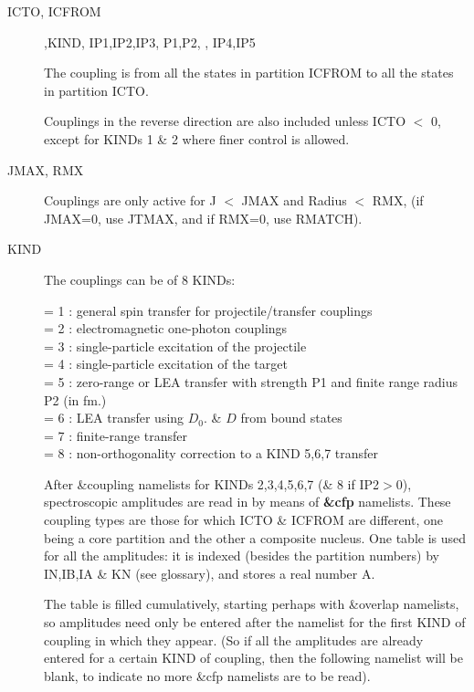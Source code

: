 \documentclass[11pt]{article}
\begin{document}
\begin{description}
\item[ICTO, ICFROM] ,KIND,  IP1,IP2,IP3,  P1,P2,  , IP4,IP5

The coupling is from all the states in partition ICFROM
to all the states in partition ICTO.

Couplings in the reverse direction are also included unless
ICTO $<$ 0, except for KINDs 1 \& 2 where finer control is allowed.

\item[JMAX, RMX]
Couplings are only active for J $<$ JMAX and Radius $<$ RMX,
(if JMAX=0, use JTMAX, and if RMX=0, use  RMATCH).

\item[KIND]
The couplings can be of 8 KINDs:

            = 1 : general spin transfer for projectile/transfer couplings\\
            = 2 : electromagnetic one-photon couplings\\
            = 3 : single-particle excitation of the projectile\\
            = 4 : single-particle excitation of the target\\
            = 5 : zero-range or LEA transfer with strength P1 and finite range radius P2 (in fm.)\\
            = 6 : LEA transfer using $D_0$. \& $D$ from bound states\\
            = 7 : finite-range transfer\\
            = 8 : non-orthogonality correction to a KIND 5,6,7 transfer %

After \&coupling namelists for KINDs 2,3,4,5,6,7 (\& 8 if IP2$>$0),
spectroscopic amplitudes are read in by means of {\bf \&cfp} namelists.
These coupling types are those for which ICTO \& ICFROM are
different, one being a core partition and the other a composite
nucleus. One table is used for all the amplitudes: it is indexed
(besides the partition numbers) by IN,IB,IA \& KN (see glossary),
and stores a real number A.

The table is filled cumulatively,
starting perhaps with \&overlap namelists, 
so amplitudes need only be
entered after the namelist for the first KIND of coupling in which
they appear.
(So if all the amplitudes are already entered for a certain KIND
of coupling, then the following namelist will be blank, to indicate
no more \&cfp namelists are to be read).


\end{description}
\end{document}
